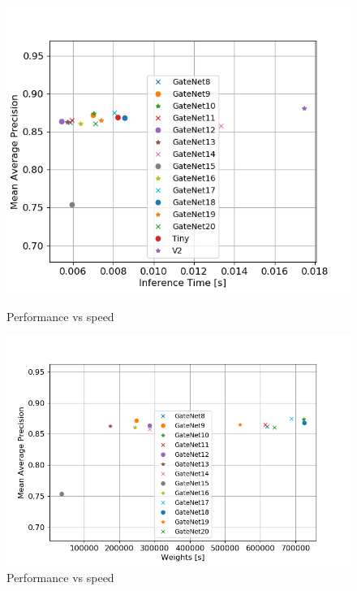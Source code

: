 \documentclass{article}
\begin{document}
\begin{figure}
	\centering
	\begin{minipage}{0.45\linewidth}
		\includegraphics[width=\linewidth]{fig/perf_speed}
		\caption{Performance vs speed}
	\end{minipage}
	\begin{minipage}{0.45\linewidth}
		\includegraphics[width=\linewidth]{fig/perf_weights}
		\caption{Performance vs speed}
	\end{minipage}
	
\end{figure}
\end{document}
